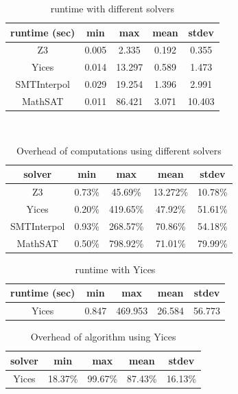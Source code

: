 \begin{table}
  \centering
  \begin{tabular}{ |c||c|c|c|c| }
    \hline
     runtime (sec) & min & max & mean & stdev \\[0.5ex]
    \hline\hline
    Z3   & 0.005 & 2.335 & 0.192 & 0.355 \\[0.5ex]
    Yices &   0.014  & 13.297   & 0.589 & 1.473 \\[0.5ex]
    SMTInterpol& 0.029 & 19.254 &  1.396 & 2.991 \\[0.5ex]
    MathSAT & 0.011 & 86.421 &  3.071 & 10.403 \\[0.5ex]
    \hline
  \end{tabular} \\
  \caption{\ucalg runtime with different solvers}
  \label{tab:runtime-ucalg}
\end{table}

\begin{table}
  \centering
  \begin{tabular}{ |c||c|c|c|c| }
    \hline
     solver & min & max & mean & stdev \\[0.5ex]
    \hline
    Z3   & 0.73\% & 45.69\% & 13.272\% & 10.78\% \\[0.5ex]
    Yices &   0.20\%  & 419.65\%   & 47.92\% & 51.61\% \\[0.5ex]
    SMTInterpol& 0.93\% & 268.57\% &  70.86\% & 54.18\%\\[0.5ex]
    MathSAT & 0.50\% & 798.92\% &  71.01\% & 79.99\%\\[0.5ex]
    \hline
  \end{tabular}
  \caption{Overhead of \ucalg computations using different solvers}
  \label{tab:overhead-ucalg}
\end{table}

\begin{table}
  \centering
  \begin{tabular}{ |c||c|c|c|c| }
    \hline
     runtime (sec) & min & max & mean & stdev \\[0.5ex]
    \hline
    Yices &   0.847  & 469.953   & 26.584 & 56.773 \\[0.5ex]
    \hline
  \end{tabular}
  \caption{\ucbfalg runtime with Yices}
  \label{tab:runtime-ucbfalg}
\end{table}

\begin{table}
  \centering
  \begin{tabular}{ |c||c|c|c|c| }
    \hline
     solver & min & max & mean & stdev \\[0.5ex]
    \hline
    Yices &   18.37\%  & 99.67\%   & 87.43\% & 16.13\% \\[0.5ex]
    \hline
  \end{tabular}
  \caption{Overhead of \ucbfalg algorithm using Yices}
  \label{tab:overhead-ucbfalg}
\end{table}


